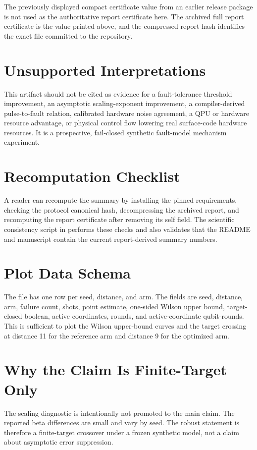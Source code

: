 \documentclass[11pt]{article}
\begin{document}
The previously displayed compact certificate value from an earlier release
package is not used as the authoritative report certificate here. The archived
full report certificate is the value printed above, and the compressed report
hash identifies the exact file committed to the repository.

\section{Unsupported Interpretations}
This artifact should not be cited as evidence for a fault-tolerance threshold improvement, an asymptotic scaling-exponent improvement, a compiler-derived pulse-to-fault relation, calibrated hardware noise agreement, a QPU or hardware resource advantage, or physical control flow lowering real surface-code hardware resources. It is a prospective, fail-closed synthetic fault-model mechanism experiment.

\clearpage
\appendix
\section{Recomputation Checklist}
A reader can recompute the summary by installing the pinned requirements,
checking the protocol canonical hash, decompressing the archived report, and
recomputing the report certificate after removing its self field. The scientific
consistency script in  performs
these checks and also validates that the README and manuscript contain the
current report-derived summary numbers.

\section{Plot Data Schema}
The file  has one row per seed,
distance, and arm. The fields are seed, distance, arm, failure count, shots,
point estimate, one-sided Wilson upper bound, target-closed boolean, active
coordinates, rounds, and active-coordinate qubit-rounds. This is sufficient to
plot the Wilson upper-bound curves and the target crossing at distance 11 for
the reference arm and distance 9 for the optimized arm.

\section{Why the Claim Is Finite-Target Only}
The scaling diagnostic is intentionally not promoted to the main claim. The
reported beta differences are small and vary by seed. The robust statement is
therefore a finite-target crossover under a frozen synthetic model, not a claim
about asymptotic error suppression.
\end{document}
